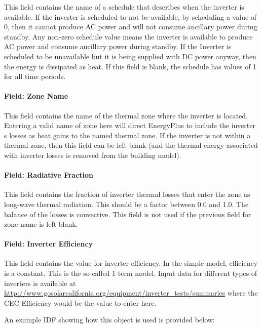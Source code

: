 This field contains the name of a schedule that describes when the inverter is available. If the inverter is scheduled to not be available, by scheduling a value of 0, then it cannot produce AC power and will not consume ancillary power during standby. Any non-zero schedule value means the inverter is available to produce AC power and consume ancillary power during standby. If the Inverter is scheduled to be unavailable but it is being supplied with DC power anyway, then the energy is dissipated as heat. If this field is blank, the schedule has values of 1 for all time periods.

\paragraph{Field: Zone Name}\label{field-zone-name-1-003}

This field contains the name of the thermal zone where the inverter is located. Entering a valid name of zone here will direct EnergyPlus to include the inverter s losses as heat gains to the named thermal zone. If the inverter is not within a thermal zone, then this field can be left blank (and the thermal energy associated with inverter losses is removed from the building model).

\paragraph{Field: Radiative Fraction}\label{field-radiative-fraction-1}

This field contains the fraction of inverter thermal losses that enter the zone as long-wave thermal radiation. This should be a factor between 0.0 and 1.0. The balance of the losses is convective. This field is not used if the previous field for zone name is left blank.

\paragraph{Field: Inverter Efficiency}\label{field-inverter-efficiency}

This field contains the value for inverter efficiency. In the simple model, efficiency is a constant. This is the so-called 1-term model. Input data for different types of inverters is available at \url{http://www.gosolarcalifornia.org/equipment/inverter_tests/summaries} where the CEC Efficiency would be the value to enter here.

An example IDF showing how this object is used is provided below:

